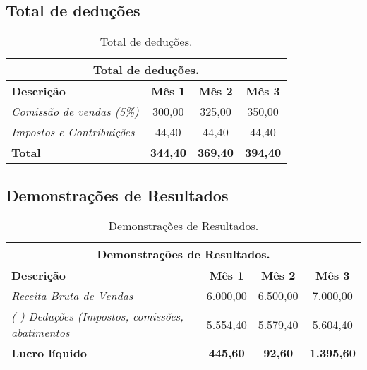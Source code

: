         
        
        \subsection{Total de deduções}
        
        
		\begin{table}[htbp]
			\centering
			\caption{Total de deduções.}
			
			
				\begin{tabularx}{\linewidth}{|X|c|c|c|}
					\toprule
					\multicolumn{4}{c}{\cellcolor{gray!50}\textbf{Total de deduções.}} \\
					\midrule
					\textbf{Descrição} & \textbf{Mês 1} & \textbf{Mês 2} & \textbf{Mês 3}	\\
					\midrule
					\textit{Comissão de vendas (5\%)}	&	300,00	& 325,00 	& 350,00 	\\
					\textit{Impostos e Contribuições}	& 	44,40 	& 44,40 	& 44,40 	\\
					\midrule
					\textbf{Total}						&	\textbf{344,40} 	& 	\textbf{369,40} 	& \textbf{394,40} 	\\
					\bottomrule
				\end{tabularx}
			
			
			\label{tab:totalDeducoes}%
		\end{table}%
		
        
        
        \subsection{Demonstrações de Resultados}
        
		\begin{table}[H]
			\centering
			\caption{Demonstrações de Resultados.}
			
				\begin{tabularx}{\linewidth}{|X|c|c|c|}
					\toprule
					\multicolumn{4}{c}{\cellcolor{gray!50}\textbf{Demonstrações de Resultados.}} \\
					\midrule
					\textbf{Descrição} & \textbf{Mês 1} & \textbf{Mês 2} & \textbf{Mês 3} \\
					\midrule
					\textit{Receita Bruta de Vendas}						&	6.000,00		& 6.500,00		 & 7.000,00 \\
					\textit{(-) Deduções (Impostos, comissões, abatimentos}	& 5.554,40 			& 5.579,40 		& 5.604,40 \\
                    \midrule
					\textbf{Lucro líquido}									& \textbf{445,60} 	& \textbf{92,60} & \textbf{1.395,60} \\
					\bottomrule
				\end{tabularx}
			
			
			\label{tab:Demonstracoes}%
		\end{table}%
        
